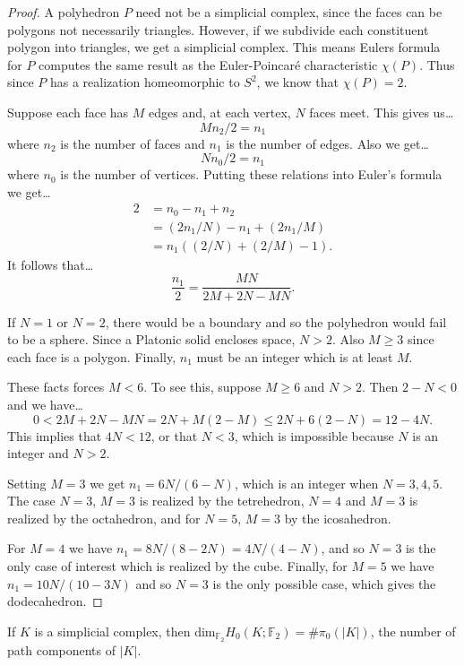 \begin{proof}
A polyhedron $P$ need not be a simplicial complex, since the faces can be polygons not necessarily triangles. However,
if we subdivide each constituent polygon into triangles, we get a simplicial complex. This means Eulers formula for $P$
computes the same result as the Euler-Poincar\'e characteristic $\chi(P)$. Thus since $P$ has a realization homeomorphic
to $S^2$, we know that $\chi(P) = 2$.

Suppose each face has $M$ edges and, at each vertex, $N$ faces meet. This gives us\dots
$$M n_2 / 2 = n_1$$
where $n_2$ is the number of faces and $n_1$ is the number of edges. Also we get\dots
$$N n_0 / 2 = n_1$$
where $n_0$ is the number of vertices. Putting these relations into Euler's formula we get\dots
\begin{align*}
    2 &= n_0 - n_1 + n_2\\
      &= (2n_1/N) - n_1 + (2n_1/M)\\
      &= n_1((2/N) + (2/M) - 1).
\end{align*}
It follows that\dots
$$\frac{n_1}{2} = \frac{MN}{2M + 2N - MN}.$$

If $N=1$ or $N=2$, there would be a boundary and so the polyhedron would fail to be a sphere. Since a Platonic solid
encloses space, $N > 2$. Also $M \geq 3$ since each face is a polygon. Finally, $n_1$ must be an integer which is at least
$M$.

These facts forces $M < 6$. To see this, suppose $M \geq 6$ and $N > 2$. Then $2 - N < 0$ and we have\dots
$$0 < 2M + 2N - MN = 2N + M(2 - M) \leq 2N + 6(2-N) = 12 - 4N.$$
This implies that $4N < 12$, or that $N<3$, which is impossible because $N$ is an integer and $N>2$.

Setting $M=3$ we get $n_1 = 6N/(6-N)$, which is an integer when $N = 3,4,5$. The case $N = 3$, $M = 3$ is realized by
the tetrehedron, $N = 4$ and $M = 3$ is realized by the octahedron, and for $N=5$, $M=3$ by the icosahedron.

For $M=4$ we have $n_1 = 8N/(8-2N) = 4N/(4-N)$, and so $N=3$ is the only case of interest which is realized by the cube.
Finally, for $M=5$ we have $n_1 = 10N/(10 - 3N)$ and so $N=3$ is the only possible case, which gives the dodecahedron.
\end{proof}

\begin{theorem}
If $K$ is a simplicial complex, then dim$_{\mathbb{F}_2} H_0(K; \mathbb{F}_2) = \#\pi_0(|K|)$, the number of path components of $|K|$.
\end{theorem}

